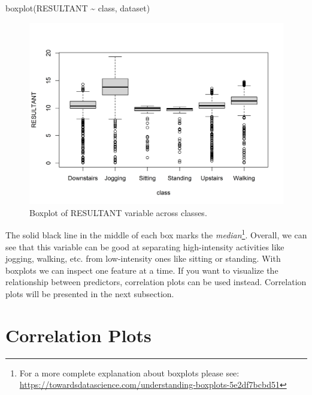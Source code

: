 \documentclass[
  11pt,
]{krantz}
\newenvironment{Shaded}{\begin{snugshade}}{\end{snugshade}}
\newcommand{\FunctionTok}[1]{\textcolor[rgb]{0,0,0}{#1}}
\newcommand{\NormalTok}[1]{#1}
\newcommand{\SpecialCharTok}[1]{\textcolor[rgb]{0,0,0}{#1}}
\begin{document}
\begin{Shaded}
\begin{Highlighting}[]
\FunctionTok{boxplot}\NormalTok{(RESULTANT }\SpecialCharTok{\textasciitilde{}}\NormalTok{ class, dataset)}
\end{Highlighting}
\end{Shaded}

\begin{figure}

{\centering \includegraphics[width=1\linewidth]{images/boxplotres} 

}

\caption{Boxplot of RESULTANT variable across classes.}\label{fig:boxplotres}
\end{figure}

The solid black line in the middle of each box marks the \emph{median}\footnote{For a more complete explanation about boxplots please see: \url{https://towardsdatascience.com/understanding-boxplots-5e2df7bcbd51}}. Overall, we can see that this variable can be good at separating high-intensity activities like jogging, walking, etc. from low-intensity ones like sitting or standing. With boxplots we can inspect one feature at a time. If you want to visualize the relationship between predictors, correlation plots can be used instead. Correlation plots will be presented in the next subsection.

\hypertarget{correlation-plots}{%
\section{Correlation Plots}\label{correlation-plots}}
\end{document}
